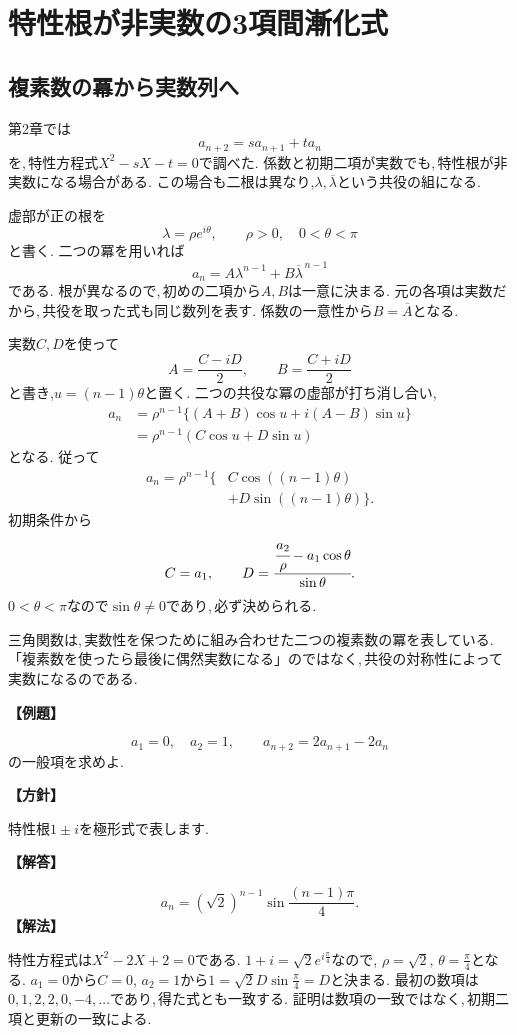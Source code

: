 \section{特性根が非実数の3項間漸化式}\label{節：非実数の特性根}
\subsection{複素数の冪から実数列へ}

第2章では
\[
 a_{n+2}=s a_{n+1}+t a_n
\]
を,\,特性方程式$X^2-sX-t=0$で調べた.
係数と初期二項が実数でも,\,特性根が非実数になる場合がある.
この場合も二根は異なり,$\lambda,\overline\lambda$という共役の組になる.

虚部が正の根を
\[
 \lambda=\rho e^{i\theta},
 \qquad \rho>0,\quad 0<\theta<\pi
\]
と書く.
二つの冪を用いれば
\[
 a_n=A\lambda^{n-1}+B\overline\lambda^{\,n-1}
\]
である.
根が異なるので,\,初めの二項から$A,B$は一意に決まる.
元の各項は実数だから,\,共役を取った式も同じ数列を表す.
係数の一意性から$B=\overline A$となる.

実数$C,D$を使って
\[
 A=\frac{C-iD}{2},\qquad B=\frac{C+iD}{2}
\]
と書き,$u=(n-1)\theta$と置く.
二つの共役な冪の虚部が打ち消し合い,
\[
 \begin{aligned}
 a_n
 &=\rho^{n-1}\{(A+B)\cos u+i(A-B)\sin u\}\\
 &=\rho^{n-1}(C\cos u+D\sin u)
 \end{aligned}
\]
となる.
従って
\[
 \begin{aligned}
 a_n=\rho^{n-1}\{&
 C\cos((n-1)\theta)\\
 &+D\sin((n-1)\theta)\}.
 \end{aligned}
\]
初期条件から
\[
 C=a_1,\qquad
 D=\cfrac{\cfrac{a_2}{\rho}-a_1\cos\theta}{\sin\theta}.
\]
$0<\theta<\pi$なので$\sin\theta\ne0$であり,\,必ず決められる.

三角関数は,\,実数性を保つために組み合わせた二つの複素数の冪を表している.
「複素数を使ったら最後に偶然実数になる」のではなく,\,共役の対称性によって実数になるのである.

\noindent\textbf{【例題】}\par\nobreak
\[
 a_1=0,\quad a_2=1,\qquad
 a_{n+2}=2a_{n+1}-2a_n
\]
の一般項を求めよ.

\noindent\textbf{【方針】}\par\nobreak
特性根$1\pm i$を極形式で表します.

\noindent\textbf{【解答】}\par\nobreak
\[
 a_n=(\sqrt2)^{n-1}\sin\frac{(n-1)\pi}{4}.
\]
\noindent\textbf{【解法】}\par\nobreak
特性方程式は$X^2-2X+2=0$である.
$1+i=\sqrt2e^{i\frac{\pi}{4}}$なので,
$\rho=\sqrt2,\,\theta=\frac{\pi}{4}$となる.
$a_1=0$から$C=0$,
$a_2=1$から$1=\sqrt2D\sin\frac{\pi}{4}=D$と決まる.
最初の数項は$0,1,2,2,0,-4,\ldots$であり,\,得た式とも一致する.
証明は数項の一致ではなく,\,初期二項と更新の一致による.

